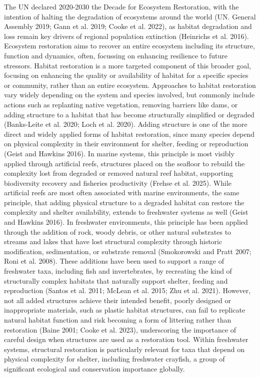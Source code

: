\documentclass[
  12pt,
  a4paper,
]{scrbook}
\begin{document}
The UN declared 2020-2030 the Decade for Ecosystem Restoration, with the
intention of halting the degradation of ecosystems around the world (UN.
General Assembly 2019; Gann et al. 2019; Cooke et al. 2022), as habitat
degradation and loss remain key drivers of regional population
extinction (Heinrichs et al. 2016). Ecosystem restoration aims to
recover an entire ecosystem including its structure, function and
dynamics, often, focussing on enhancing resilience to future stressors.
Habitat restoration is a more targeted component of this broader goal,
focusing on enhancing the quality or availability of habitat for a
specific species or community, rather than an entire ecosystem.
Approaches to habitat restoration vary widely depending on the system
and species involved, but commonly include actions such as replanting
native vegetation, removing barriers like dams, or adding structure to a
habitat that has become structurally simplified or degraded (Banks-Leite
et al. 2020; Loch et al. 2020). Adding structure is one of the more
direct and widely applied forms of habitat restoration, since many
species depend on physical complexity in their environment for shelter,
feeding or reproduction (Geist and Hawkins 2016). In marine systems,
this principle is most visibly applied through artificial reefs,
structures placed on the seafloor to rebuild the complexity lost from
degraded or removed natural reef habitat, supporting biodiversity
recovery and fisheries productivity (Frehse et al. 2025). While
artificial reefs are most often associated with marine environments, the
same principle, that adding physical structure to a degraded habitat can
restore the complexity and shelter availability, extends to freshwater
systems as well (Geist and Hawkins 2016). In freshwater environments,
this principle has been applied through the addition of rock, woody
debris, or other natural substrates to streams and lakes that have lost
structural complexity through historic modification, sedimentation, or
substrate removal (Smokorowski and Pratt 2007; Roni et al. 2008). These
additions have been used to support a range of freshwater taxa,
including fish and invertebrates, by recreating the kind of structurally
complex habitats that naturally support shelter, feeding and
reproduction (Santos et al. 2011; McLean et al. 2015; Zhu et al. 2021).
However, not all added structures achieve their intended benefit, poorly
designed or inappropriate materials, such as plastic habitat structures,
can fail to replicate natural habitat function and risk becoming a form
of littering rather than restoration (Baine 2001; Cooke et al. 2023),
underscoring the importance of careful design when structures are used
as a restoration tool. Within freshwater systems, structural restoration
is particularly relevant for taxa that depend on physical complexity for
shelter, including freshwater crayfish, a group of significant
ecological and conservation importance globally.
\end{document}
